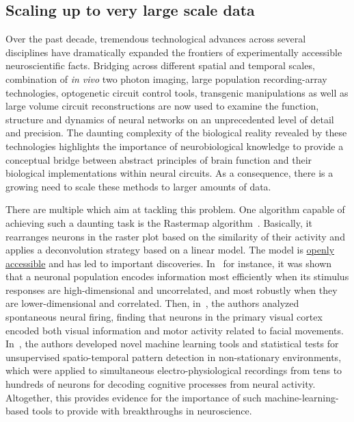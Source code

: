 \documentclass[brainsci, %
               review,submit,pdftex,moreauthors
               ]{Definitions/mdpi}
\begin{document}
\subsection{Scaling up to very large scale data}
Over the past decade, tremendous technological advances across several disciplines have dramatically expanded the frontiers of experimentally accessible neuroscientific facts. Bridging across different spatial and temporal scales, combination of \textit{in vivo} two photon imaging, large population recording-array technologies, optogenetic circuit control tools, transgenic manipulations as well as large volume circuit reconstructions are now used to examine the function, structure and dynamics of neural networks on an unprecedented level of detail and precision. The daunting complexity of the biological reality revealed by these technologies highlights the importance of neurobiological knowledge to provide a conceptual bridge between abstract principles of brain function and their biological implementations within neural circuits. As a consequence, there is a growing need to scale these methods to larger amounts of data. 

There are multiple  which aim at tackling this problem. One algorithm capable of achieving such a daunting task is the Rastermap algorithm~\citep{pachitariu_robustness_2018}. Basically, it rearranges neurons in the raster plot based on the similarity of their activity and applies a deconvolution strategy based on a linear model. The model is \href{https://github.com/MouseLand/rastermap}{openly accessible} and has led to important discoveries. In~\citet{stringer_spontaneous_2019,stringer_high-dimensional_2019} for instance, it was shown that a neuronal population encodes information most efficiently when its stimulus responses are high-dimensional and uncorrelated, and most robustly when they are lower-dimensional and correlated. Then, in~\citep{stringer_high-precision_2021}, the authors analyzed spontaneous neural firing, finding that neurons in the primary visual cortex encoded both visual information and motor activity related to facial movements. In~\citep{russo_cell_2017}, the authors developed novel machine learning tools and statistical tests for unsupervised spatio-temporal pattern detection in non-stationary environments, which were applied to simultaneous electro-physiological recordings from tens to hundreds of neurons for decoding cognitive processes from neural activity. Altogether, this provides evidence for the importance of such machine-learning-based tools to provide with breakthroughs in neuroscience.
\end{document}
